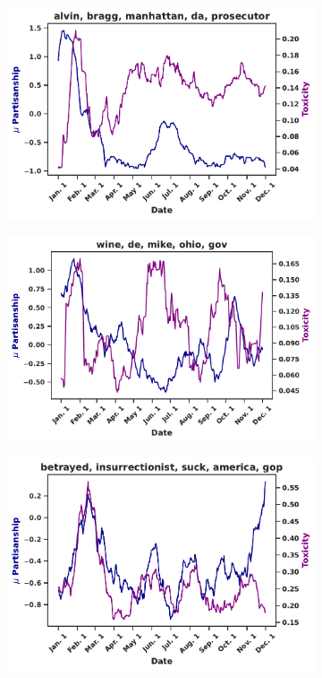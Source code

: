 \begin{figure}
\begin{subfigure}[l]{0.32\textwidth}
\includegraphics[width=1\columnwidth]{figures/alvin-lib-final-20240425.pdf} 
\caption{}
\label{fig:alvin}
\end{subfigure}
\begin{subfigure}[l]{0.32\textwidth}
\includegraphics[width=1\columnwidth]{figures/wine-lib-final-20240425.pdf} 
\caption{}
\label{fig:wind}
\end{subfigure}
\begin{subfigure}[l]{0.32\textwidth}
\includegraphics[width=1\columnwidth]{figures/betrayed-lib-final-20240425.pdf} 
\caption{}
\label{fig:betrayed}


\end{subfigure}
\end{figure}
